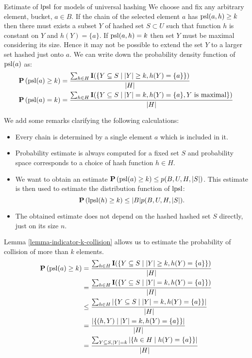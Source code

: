 \begin{section}{Estimate of $\mathrm{lpsl}$ for models of universal hashing}
We choose and fix any arbitrary element, bucket, $a \in B$. If the chain of the selected element $a$ has $\mathrm{psl}(a, h) \geq k$ then there must exists a subset $Y$ of hashed set $S \subset U$ such that function $h$ is constant on $Y$ and $h(Y) = \{ a \}$. If $\mathrm{psl}(a, h) = k$ then set $Y$ must be maximal considering its size. Hence it may not be possible to extend the set $Y$ to a larger set hashed just onto $a$. We can write down the probability density function of $\mathrm{psl}(a)$ as:
\begin{displaymath}
\begin{split}
\mathbf{P}\left(\mathrm{psl}(a) \geq k\right) & = \frac{\sum\displaylimits_{h \in H} \mathbf{I}(\{ Y \subseteq S \mid |Y| \geq k, h(Y) = \{ a \} \})}{|H|} \\
\mathbf{P}\left(\mathrm{psl}(a) = k\right) & = \frac{\sum\displaylimits_{h \in H} \mathbf{I}(\{ Y \subseteq S \mid |Y| = k, h(Y) = \{ a \}, Y \text{ is maximal} \})}{|H|} \\
\end{split}
\end{displaymath}

We add some remarks clarifying the following calculations:
\begin{itemize}
\item Every chain is determined by a single element $a$ which is included in it.
\item Probability estimate is always computed for a fixed set $S$ and probability space corresponds to a choice of hash function $h \in H$.
\item We want to obtain an estimate $\mathbf{P}\left(\mathrm{psl}(a) \geq k\right) \leq p(B, U, H, |S|)$. This estimate is then used to estimate the distribution function of $\mathrm{lpsl}$: \[ \mathbf{P}\left(\mathrm{lpsl}(h) \geq k\right) \leq |B| p(B, U, H, |S|) \text{.} \] 
\item The obtained estimate does not depend on the hashed hashed set $S$ directly, just on its size $n$.
\end{itemize}

Lemma \ref{lemma-indicator-k-collision} allows us to estimate the probability of collision of more than $k$ elements.
\begin{displaymath}
\begin{split}
\mathbf{P}\left(\mathrm{psl}(a) \geq k\right)
	& = \frac{\sum\displaylimits_{h \in H} \mathbf{I}(\{ Y \subseteq S \mid |Y| \geq k, h(Y) = \{ a \} \})}{|H|} \\
	& = \frac{\sum\displaylimits_{h \in H} \mathbf{I}(\{ Y \subseteq S \mid |Y| = k, h(Y) = \{ a \} \})}{|H|} \\
	& \leq \frac{\sum\displaylimits_{h \in H} |\{ Y \subseteq S \mid |Y| = k, h(Y) = \{ a \} \}|}{|H|} \\
	& = \frac{|\{ (h, Y) \mid |Y| = k, h(Y) = \{ a \} \}|}{|H|} \\
	& = \frac{\sum\displaylimits_{Y \subseteq S, |Y| = k} | \{ h \in H \mid h(Y) = \{a\} \}|}{|H|} \\
\end{split}
\end{displaymath}


\end{section}
